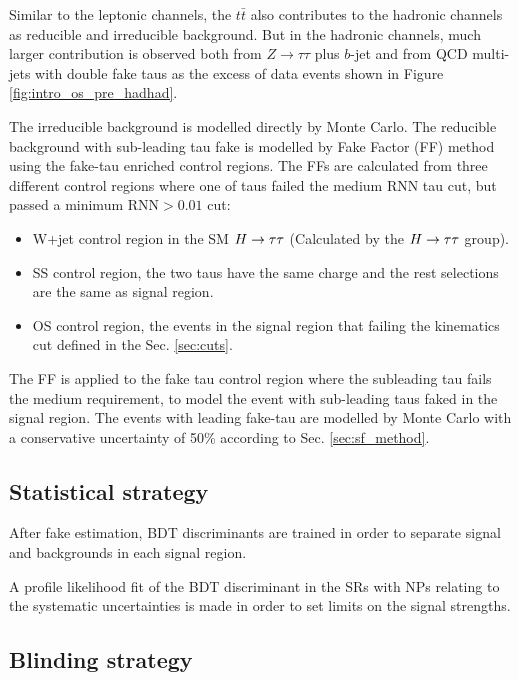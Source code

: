 Similar to the leptonic channels, the $t\bar{t}$ also contributes to the hadronic channels as reducible and irreducible background. But in the hadronic channels, much larger contribution is observed both from $Z\to \tau\tau$ plus $b$-jet and from QCD multi-jets  with double fake taus as the excess of data events shown in Figure \ref{fig:intro_os_pre_hadhad}. 



The irreducible background is modelled directly by Monte Carlo. The reducible background with sub-leading tau fake is modelled by Fake Factor (FF) method using the
fake-tau enriched control regions. The FFs are calculated from three different control regions where one of taus failed the medium RNN tau cut, but passed
a minimum RNN$>0.01$ cut:

\begin{itemize}
	\item W+jet control region in the SM $H \rightarrow \tau\tau$ (Calculated by the $H \rightarrow \tau\tau$ group).
	\item SS control region, the two taus have the same charge and the rest selections are the same as signal region.
	\item OS control region, the events in the signal region that failing the kinematics cut defined in the Sec. \ref{sec:cuts}.
\end{itemize}

The FF is applied to the fake tau control region where the subleading tau fails the medium requirement, to model the event with sub-leading taus faked in the signal region. The events with leading fake-tau are modelled by Monte Carlo with a conservative uncertainty of 50\% according to Sec. \ref{sec:sf_method}.

\subsection{Statistical strategy}
\label{sec:statStrategy}

After fake estimation, BDT discriminants are trained in order to separate signal and backgrounds in each signal region.

A profile likelihood fit of the BDT discriminant in the SRs with NPs relating to the systematic uncertainties is made in order to set limits on the signal strengths.

\subsection{Blinding strategy}
\label{sec:blind}


